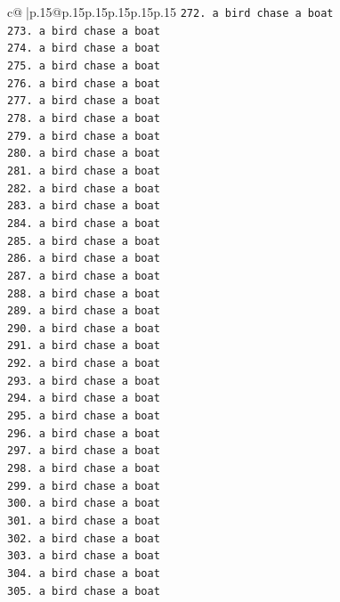 \documentclass{article}
\begin{document}
{\begin{supertabular}{c@{$\;$}|p{.15\linewidth}@{}p{.15\linewidth}p{.15\linewidth}p{.15\linewidth}p{.15\linewidth}p{.15\linewidth}}
{{{\texttt{272. a bird chase a boat} \\
\texttt{273. a bird chase a boat} \\
\texttt{274. a bird chase a boat} \\
\texttt{275. a bird chase a boat} \\
\texttt{276. a bird chase a boat} \\
\texttt{277. a bird chase a boat} \\
\texttt{278. a bird chase a boat} \\
\texttt{279. a bird chase a boat} \\
\texttt{280. a bird chase a boat} \\
\texttt{281. a bird chase a boat} \\
\texttt{282. a bird chase a boat} \\
\texttt{283. a bird chase a boat} \\
\texttt{284. a bird chase a boat} \\
\texttt{285. a bird chase a boat} \\
\texttt{286. a bird chase a boat} \\
\texttt{287. a bird chase a boat} \\
\texttt{288. a bird chase a boat} \\
\texttt{289. a bird chase a boat} \\
\texttt{290. a bird chase a boat} \\
\texttt{291. a bird chase a boat} \\
\texttt{292. a bird chase a boat} \\
\texttt{293. a bird chase a boat} \\
\texttt{294. a bird chase a boat} \\
\texttt{295. a bird chase a boat} \\
\texttt{296. a bird chase a boat} \\
\texttt{297. a bird chase a boat} \\
\texttt{298. a bird chase a boat} \\
\texttt{299. a bird chase a boat} \\
\texttt{300. a bird chase a boat} \\
\texttt{301. a bird chase a boat} \\
\texttt{302. a bird chase a boat} \\
\texttt{303. a bird chase a boat} \\
\texttt{304. a bird chase a boat} \\
\texttt{305. a bird chase a boat} \\
}}}
\end{supertabular}}
\end{document}
